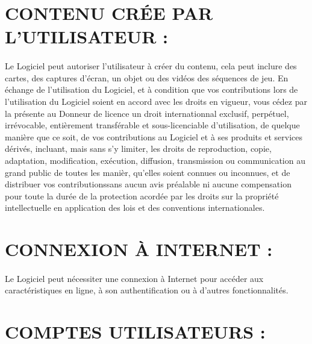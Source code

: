 \documentclass[titlepage, 13px, a4paper]{report}
\begin{document}
\section*{CONTENU CRÉE PAR L'UTILISATEUR :}
\paragraph*{} \hspace{0pt}
Le Logiciel peut autoriser l'utilisateur à créer du contenu, cela peut inclure
des cartes, des captures d'écran, un objet ou des vidéos des séquences de jeu.
En échange de l'utilisation du Logiciel, et à condition que vos contributions
lors de l'utilisation du Logiciel soient en accord avec les droits en vigueur, 
vous cédez par la présente au Donneur de licence un droit internationnal
exclusif, perpétuel, irrévocable, entièrement transférable et sous-licenciable
d'utilisation, de quelque manière que ce soit, de vos contributions au Logiciel
et à ses produits et services dérivés, incluant, mais sans s'y limiter, les
droits de reproduction, copie, adaptation, modification, exécution, diffusion,
transmission ou communication au grand public de toutes les manièr, qu'elles
soient connues ou inconnues, et de distribuer vos contributionssans aucun avis
préalable ni aucune compensation pour toute la durée de la protection acordée
par les droits sur la propriété intellectuelle en application des lois et des
conventions internationales. \\


\section*{CONNEXION À INTERNET :}
\paragraph*{} \hspace{0pt}
Le Logiciel peut nécessiter une connexion à Internet pour accéder aux
caractéristiques en ligne, à son authentification ou à d'autres fonctionnalités. \\
 

\section*{COMPTES UTILISATEURS :}
\paragraph*{} \hspace{0pt}
\end{document}
